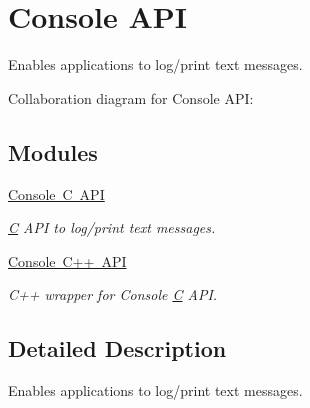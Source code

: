 \hypertarget{group__consoleapi}{}\section{Console A\+PI}
\label{group__consoleapi}


Enables applications to log/print text messages.  


Collaboration diagram for Console A\+PI\+:
\subsection*{Modules}
\begin{DoxyCompactItemize}
\item 
\mbox{\hyperlink{group__consolecapi}{Console C A\+PI}}
\begin{DoxyCompactList}\small\item\em \mbox{\hyperlink{struct_c}{C}} A\+PI to log/print text messages. \end{DoxyCompactList}\item 
\mbox{\hyperlink{group__console_cppapi}{Console C++ A\+PI}}
\begin{DoxyCompactList}\small\item\em C++ wrapper for Console \mbox{\hyperlink{struct_c}{C}} A\+PI. \end{DoxyCompactList}\end{DoxyCompactItemize}


\subsection{Detailed Description}
Enables applications to log/print text messages. 

